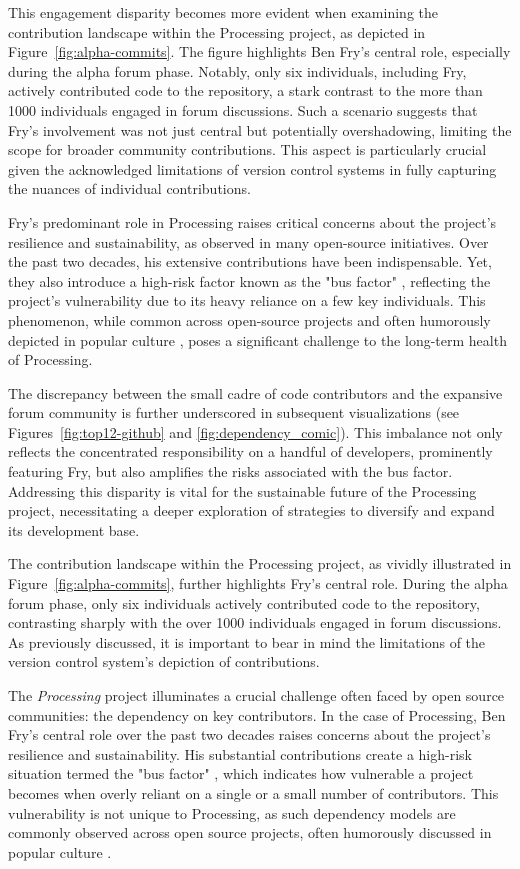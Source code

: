 This engagement disparity becomes more evident when examining the contribution landscape within the Processing project, as depicted in Figure~\ref{fig:alpha-commits}. The figure highlights Ben Fry's central role, especially during the alpha forum phase. Notably, only six individuals, including Fry, actively contributed code to the repository, a stark contrast to the more than 1000 individuals engaged in forum discussions. Such a scenario suggests that Fry's involvement was not just central but potentially overshadowing, limiting the scope for broader community contributions. This aspect is particularly crucial given the acknowledged limitations of version control systems in fully capturing the nuances of individual contributions.

Fry's predominant role in Processing raises critical concerns about the project's resilience and sustainability, as observed in many open-source initiatives. Over the past two decades, his extensive contributions have been indispensable. Yet, they also introduce a high-risk factor known as the "bus factor" \parencite{BusFactor2023}, reflecting the project's vulnerability due to its heavy reliance on a few key individuals. This phenomenon, while common across open-source projects and often humorously depicted in popular culture \parencite{munroeDependency2020}, poses a significant challenge to the long-term health of Processing.

The discrepancy between the small cadre of code contributors and the expansive forum community is further underscored in subsequent visualizations (see Figures~\ref{fig:top12-github} and \ref{fig:dependency_comic}). This imbalance not only reflects the concentrated responsibility on a handful of developers, prominently featuring Fry, but also amplifies the risks associated with the bus factor. Addressing this disparity is vital for the sustainable future of the Processing project, necessitating a deeper exploration of strategies to diversify and expand its development base.

The contribution landscape within the Processing project, as vividly illustrated in Figure~\ref{fig:alpha-commits}, further highlights Fry's central role. During the alpha forum phase, only six individuals actively contributed code to the repository, contrasting sharply with the over 1000 individuals engaged in forum discussions. As previously discussed, it is important to bear in mind the limitations of the version control system's depiction of contributions.

The \textit{Processing} project illuminates a crucial challenge often faced by open source communities: the dependency on key contributors. In the case of Processing, Ben Fry's central role over the past two decades raises concerns about the project's resilience and sustainability. His substantial contributions create a high-risk situation termed the "bus factor" \parencite{BusFactor2023}, which indicates how vulnerable a project becomes when overly reliant on a single or a small number of contributors. This vulnerability is not unique to Processing, as such dependency models are commonly observed across open source projects, often humorously discussed in popular culture \parencite{munroeDependency2020}.

